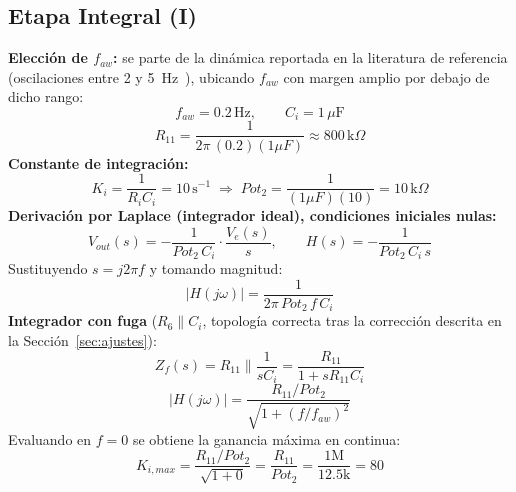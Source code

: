 \documentclass[conference]{IEEEtran}
\begin{document}
\subsection{Etapa Integral (I)}
\textbf{Elección de $f_{aw}$:} se parte de la dinámica reportada en la literatura de referencia (oscilaciones entre 2 y 5~Hz~\cite{berkelman}), ubicando $f_{aw}$ con margen amplio por debajo de dicho rango:
\begin{equation}
f_{aw}=0.2\,\text{Hz}, \qquad C_i = 1\,\mu\text{F}
\end{equation}
\begin{equation}
R_{11}=\frac{1}{2\pi\,(0.2)(1\mu F)}\approx 800\,\text{k}\Omega
\end{equation}
\textbf{Constante de integración:}
\begin{equation}
K_i=\frac{1}{R_i C_i}=10\,\text{s}^{-1} \;\Rightarrow\; Pot_2=\frac{1}{(1\mu F)(10)}=10\,\text{k}\Omega
\end{equation}
\textbf{Derivación por Laplace (integrador ideal), condiciones iniciales nulas:}
\begin{equation}
V_{out}(s)=-\frac{1}{Pot_2\,C_i}\cdot\frac{V_e(s)}{s}, \qquad H(s)=-\frac{1}{Pot_2\,C_i\,s}
\end{equation}
Sustituyendo $s=j2\pi f$ y tomando magnitud:
\begin{equation}
\boxed{|H(j\omega)|=\frac{1}{2\pi\,Pot_2\,f\,C_i}}
\end{equation}
\textbf{Integrador con fuga} ($R_6 \parallel C_i$, topología correcta tras la corrección descrita en la Sección~\ref{sec:ajustes}):
\begin{equation}
Z_f(s)=R_{11}\parallel\frac{1}{sC_i}=\frac{R_{11}}{1+sR_{11}C_i}
\end{equation}
\begin{equation}
|H(j\omega)|=\frac{R_{11}/Pot_2}{\sqrt{1+(f/f_{aw})^2}}
\end{equation}
Evaluando en $f=0$ se obtiene la ganancia máxima en continua:
\begin{equation}
K_{i,max}=\left.\frac{R_{11}/Pot_2}{\sqrt{1+0}}\right. = \frac{R_{11}}{Pot_2}=\frac{1\text{M}}{12.5\text{k}}=\boxed{80}
\end{equation}
\end{document}
